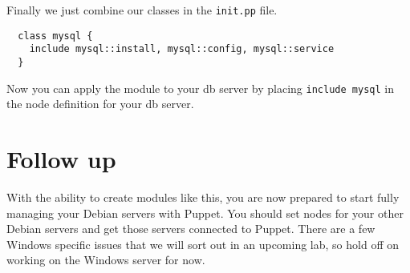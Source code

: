 \documentclass{article}   	%
\begin{document}
Finally we just combine our classes in the \texttt{init.pp} file.

\begin{verbatim}
  class mysql {
    include mysql::install, mysql::config, mysql::service
  }
\end{verbatim}

Now you can apply the module to your db server by placing \texttt{include mysql} in the node definition for your db server.

\section{Follow up}
With the ability to create modules like this, you are now prepared to start fully managing your Debian servers with Puppet.  You should set nodes for your other Debian servers and get those servers connected to Puppet. There are a few Windows specific issues that we will sort out in an upcoming lab, so hold off on working on the Windows server for now.
\end{document}
